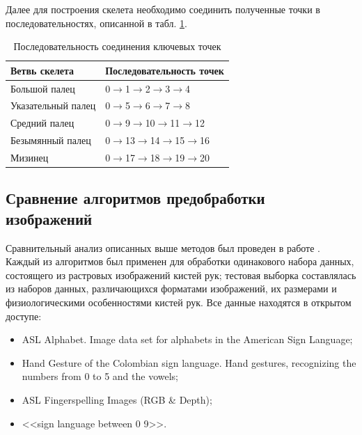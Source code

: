 Далее для построения скелета необходимо соединить полученные точки в последовательностях, описанной в табл. \ref{an:poses-table}.

\begin{table}[h]
	\caption{\label{an:poses-table}Последовательность соединения ключевых точек}
	\begin{center}
		\begin{tabular}{|p{}|p{}|}
			\hline
			Ветвь скелета & Последовательность точек \\
			\hline
			Большой палец & 0$\rightarrow$1$\rightarrow$2$\rightarrow$3$\rightarrow$4 \\	
			\hline
			Указательный палец & 0$\rightarrow$5$\rightarrow$6$\rightarrow$7$\rightarrow$8\\	
			\hline
			Средний палец & 0$\rightarrow$9$\rightarrow$10$\rightarrow$11$\rightarrow$12 \\
			\hline
			Безымянный палец & 0$\rightarrow$13$\rightarrow$14$\rightarrow$15$\rightarrow$16 \\
			\hline
			Мизинец & 0$\rightarrow$17$\rightarrow$18$\rightarrow$19$\rightarrow$20 \\
			\hline
		\end{tabular}
	\end{center}
\end{table}

\subsection{Сравнение алгоритмов предобработки изображений}

Сравнительный анализ описанных выше методов был проведен в работе \cite{Tantsevov}. Каждый из алгоритмов был применен для обработки одинакового набора данных, состоящего из растровых изображений кистей рук; тестовая выборка составлялась из наборов данных, различающихся форматами изображений, их размерами и физиологическими особенностями кистей рук. Все данные находятся в открытом доступе:

\begin{itemize}
	\item ASL Alphabet. Image data set for alphabets in the American Sign Language;
	\item Hand Gesture of the Colombian sign language. Hand gestures, recognizing the numbers from 0 to 5 and the vowels;
	\item ASL Fingerspelling Images (RGB \& Depth);
	\item <<sign language between 0 9>>.
\end{itemize}

